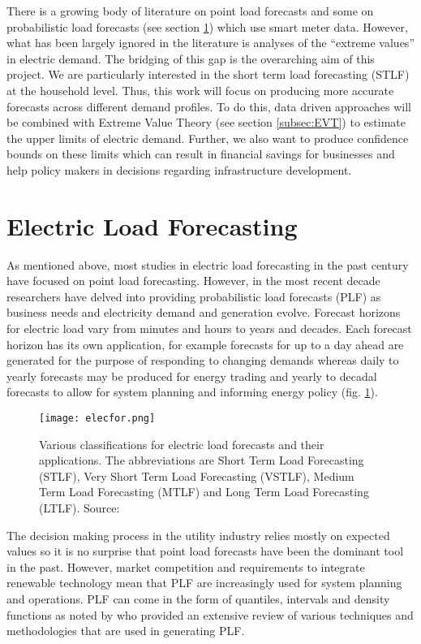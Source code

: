 There is a growing body of literature on point load forecasts and some on probabilistic load forecasts (see section \ref{subsec:litrev}) which use smart meter data. However, what has been largely ignored in the literature is analyses of the ``extreme values''  in electric demand. The bridging of this gap is the overarching aim of this project. We are particularly interested in the short term load forecasting (STLF) at the household level. Thus, this work will focus on producing more accurate forecasts across different demand profiles. To do this, data driven approaches will be combined with Extreme Value Theory (see section \ref{subsec:EVT}) to estimate the upper limits of electric demand. Further, we also want to produce confidence bounds on these limits which can result in financial savings for businesses and help policy makers in decisions regarding infrastructure development.

\section{Electric Load Forecasting} \label{subsec:litrev}

As mentioned above, most studies in electric load forecasting in the past century have focused on point load forecasting. However, in the most recent decade researchers have delved into providing probabilistic load forecasts (PLF) as business needs and electricity demand and generation evolve. Forecast horizons for electric load vary from minutes and hours to years and decades. Each forecast horizon has its own application, for example forecasts for up to a day ahead are generated for the purpose of responding to changing demands whereas daily to yearly forecasts may be produced for energy trading and yearly to decadal forecasts to allow for system planning and informing energy policy (fig. \ref{fig:elecfor}).

\begin{figure}
\centering
\texttt{[image: elecfor.png]}
\caption{Various classifications for electric load forecasts and their applications. The abbreviations are Short Term Load Forecasting (STLF), Very Short Term Load Forecasting (VSTLF), Medium Term Load Forecasting (MTLF) and Long Term Load Forecasting (LTLF). Source: \citet{hong16}}
\label{fig:elecfor} 
\end{figure}

The decision making process in the utility industry relies mostly on expected values so it is no surprise that point load forecasts have been the dominant tool in the past. However, market competition and requirements to integrate renewable technology mean that PLF are increasingly used for system planning and operations. PLF can come in the form of quantiles, intervals and density functions as noted by \citet{hong16} who provided an extensive review of various techniques and methodologies that are used in generating PLF. 

